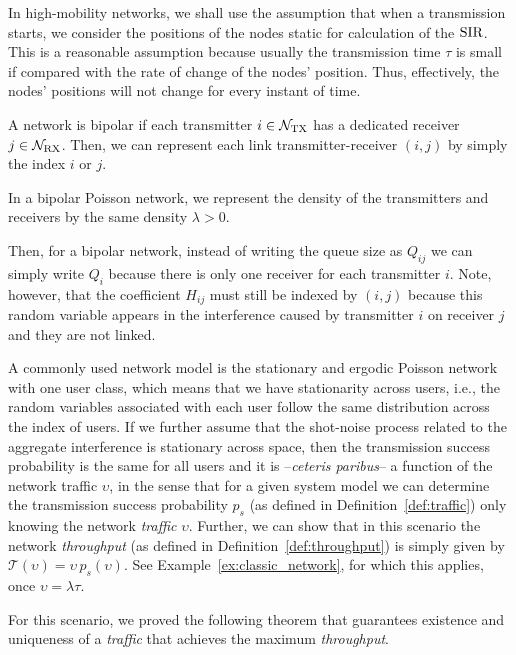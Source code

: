 In high-mobility networks, we shall use the assumption that when a transmission starts, we consider the positions of the nodes static for calculation of the $\mathrm{SIR}$.
%
This is a reasonable assumption because usually the transmission time $\tau$ is small if compared with the rate of change of the nodes' position.
%
Thus, effectively, the nodes' positions will not change for every instant of time.

\begin{definition}
    A network is bipolar if each transmitter $i\in\mathcal{N}_{\mathrm{TX}}$ has a dedicated receiver $j\in\mathcal{N}_{\mathrm{RX}}$.
    Then, we can represent each link transmitter-receiver $(i,j)$ by simply the index $i$ or $j$.
    
    In a bipolar Poisson network, we represent the density of the transmitters and receivers by the same density $\lambda > 0$.
\end{definition}

Then, for a bipolar network, instead of writing the queue size as $Q_{ij}$ we can simply write $Q_i$ because there is only one receiver for each transmitter $i$.
%
Note, however, that the coefficient $H_{ij}$ must still be indexed by $(i,j)$ because this random variable appears in the interference caused by transmitter $i$ on receiver $j$ and they are not linked.

A commonly used network model is the stationary and ergodic Poisson network with one user class, which means that we have stationarity across users, i.e., the random variables associated with each user follow the same distribution across the index of users.
%
If we further assume that the shot-noise process related to the aggregate interference is stationary across space, then the transmission success probability is the same for all users and it is --\textit{ceteris paribus}-- a  function of the network traffic $\upsilon$, in the sense that for a given system model we can determine the transmission success probability $p_s$ (as defined in Definition~\ref{def:traffic}) only knowing the network \textit{traffic} $\upsilon$.
%
Further, we can show that in this scenario the network \textit{throughput} (as defined in Definition~\ref{def:throughput}) is simply given by $\mathscr{T}(\upsilon) = \upsilon\,p_s(\upsilon)$.
%
See Example~\ref{ex:classic_network}, for which this applies, once $\upsilon=\lambda\tau$.

For this scenario, we proved the following theorem that guarantees existence and uniqueness of a \textit{traffic} that achieves the maximum \textit{throughput}. 

